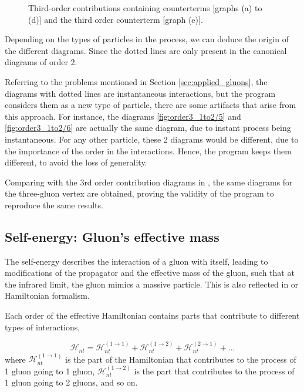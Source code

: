 \documentclass[11pt,a4paper,twoside,pdf]{article}
\numberwithin{equation}{section}
\begin{document}
\begin{figure}[h!]
\begin{subfigure}[t]{0.24\textwidth}
        \caption{ }
    \end{subfigure}%
    \caption{Third-order contributions containing counterterms [graphs (a) to (d)] and the third order
    counterterm [graph (e)].}
    \label{fig:order3_1to2/counterterms}
\end{figure}

Depending on the types of particles in the process, we can deduce the origin of the 
different diagrams. Since the dotted lines are only present in the canonical diagrams 
of order 2.

\newpage

Referring to the problems mentioned in Section \ref{sec:applied_gluons}, the diagrams 
with dotted lines are instantaneous interactions, but the program considers them
as a new type of particle, there are some artifacts that arise from this
approach. For instance, the diagrams \ref{fig:order3_1to2/5} and \ref{fig:order3_1to2/6} are actually the same 
diagram, due to instant process being instantaneous. For any other particle, these 
2 diagrams would be different, due to the importance of the order in the interactions.
Hence, the program keeps them different, to avoid the loss of generality.

Comparing with the 3rd order contribution diagrams in \cite{QCDG}, the same diagrams
for the three-gluon vertex are obtained, proving the validity of the program to reproduce the same results.

\subsection{Self-energy: Gluon's effective mass}

The self-energy describes the interaction of a gluon with itself, leading to 
modifications of the propagator and the effective mass of the gluon, such that 
at the infrared limit, the gluon mimics a massive particle.
This is also reflected in or Hamiltonian formalism.

Each order of the effective Hamiltonian contains parts that contribute to different 
types of interactions, 

\begin{equation}
    \mathcal{H}_{n t} = \mathcal{H}_{n t}^{(1 \rightarrow 1)} + \mathcal{H}_{n t}^{(1 \rightarrow 2)} + 
    \mathcal{H}_{n t}^{(2 \rightarrow 1)} + \ldots
\end{equation}
where $\mathcal{H}_{n t}^{(1 \rightarrow 1)}$ is the part of the Hamiltonian that
contributes to the process of 1 gluon going to 1 gluon, $\mathcal{H}_{n t}^{(1 \rightarrow 2)}$ 
is the part that contributes to the process of 1 gluon going to 2 gluons, and so on.
\end{document}
